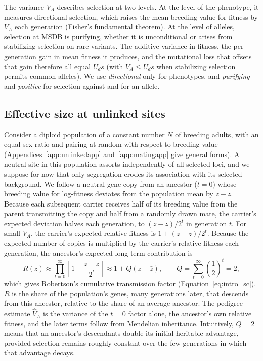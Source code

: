 \documentclass{article}
\begin{document}
The variance $V_A$ describes selection at two levels. At the level of the phenotype, it measures directional selection, which raises the mean breeding value for fitness by $V_A$ each generation (Fisher's fundamental theorem). At the level of alleles, selection at MSDB is purifying, whether it is unconditional or arises from stabilizing selection on rare variants. The additive variance in fitness, the per-generation gain in mean fitness it produces, and the mutational loss that offsets that gain therefore all equal $U_d\bar{s}$ (with $V_A \le U_d\bar{s}$ when stabilizing selection permits common alleles). We use \emph{directional} only for phenotypes, and \emph{purifying} and \emph{positive} for selection against and for an allele.

\subsection{Effective size at unlinked sites}\label{sec:unlinked}
Consider a diploid population of a constant number $N$ of breeding adults, with an equal sex ratio and pairing at random with respect to breeding value (Appendices~\ref{app:unlinkedapp} and~\ref{app:matingapp} give general forms). A neutral site in this population assorts independently of all selected loci, and we suppose for now that only segregation erodes its association with its selected background. We follow a neutral gene copy from an ancestor ($t = 0$) whose breeding value for log-fitness deviates from the population mean by $z - \bar{z}$. Because each subsequent carrier receives half of its breeding value from the parent transmitting the copy and half from a randomly drawn mate, the carrier's expected deviation halves each generation, to $(z - \bar{z})/2^t$ in generation $t$. For small $V_A$, the carrier's expected relative fitness is $1 + (z - \bar{z})/2^t$. Because the expected number of copies is multiplied by the carrier's relative fitness each generation, the ancestor's expected long-term contribution is
\begin{equation}
    R(z) \approx \prod_{t=0}^{\infty}\left[1 + \frac{z - \bar{z}}{2^t}\right] \approx 1 + Q(z - \bar{z}), \qquad Q = \sum_{t=0}^{\infty} \left(\frac{1}{2}\right)^t = 2,
\end{equation}
which gives Robertson's cumulative transmission factor (Equation~\eqref{eq:intro_sc}). $R$ is the share of the population's genes, many generations later, that descends from this ancestor, relative to the share of an average ancestor. The pedigree estimate $\hat{V}_A$ is the variance of the $t = 0$ factor alone, the ancestor's own relative fitness, and the later terms follow from Mendelian inheritance. Intuitively, $Q = 2$ means that an ancestor's descendants double its initial heritable advantage, provided selection remains roughly constant over the few generations in which that advantage decays.
\end{document}
